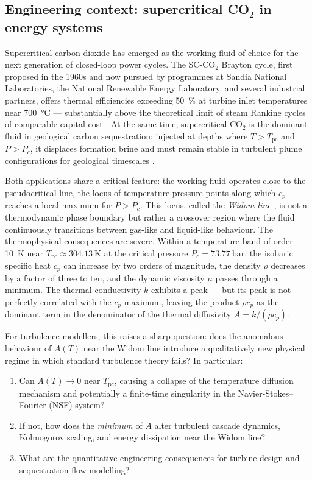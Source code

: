 \documentclass[12pt,a4paper]{article}
\newcommand{\Tc}{T_{\mathrm{pc}}}   %
\newcommand{\Pc}{P_c}               %
\newcommand{\sco}{SC-CO$_2$}
\begin{document}
\subsection{Engineering context: supercritical CO$_2$ in energy systems}
\label{sec:intro:context}

Supercritical carbon dioxide has emerged as the working fluid of choice for the next
generation of closed-loop power cycles.  The \sco{} Brayton cycle, first proposed
in the 1960s and now pursued by programmes at Sandia National Laboratories, the
National Renewable Energy Laboratory, and several industrial partners, offers thermal
efficiencies exceeding \SI{50}{\percent} at turbine inlet temperatures near
\SI{700}{\celsius} --- substantially above the theoretical limit of steam Rankine
cycles of comparable capital cost \citep{Duan2017}.  At the same time, supercritical
CO$_2$ is the dominant fluid in geological carbon sequestration: injected at depths
where $T > \Tc$ and $P > \Pc$, it displaces formation brine and must remain stable
in turbulent plume configurations for geological timescales \citep{Huppert2014}.

Both applications share a critical feature: the working fluid operates close to the
pseudocritical line, the locus of temperature-pressure points along which $c_p$
reaches a local maximum for $P > \Pc$.  This locus, called the \emph{Widom line}
\citep{Xu2005}, is not a thermodynamic phase boundary but rather a crossover region
where the fluid continuously transitions between gas-like and liquid-like behaviour.
The thermophysical consequences are severe.  Within a temperature band of order
\SI{10}{\kelvin} near $\Tc \approx \SI{304.13}{\kelvin}$ at the critical pressure
$\Pc = \SI{73.77}{\bar}$, the isobaric specific heat $c_p$ can increase by two
orders of magnitude, the density $\rho$ decreases by a factor of three to ten, and
the dynamic viscosity $\mu$ passes through a minimum.  The thermal conductivity $k$
exhibits a peak --- but its peak is not perfectly correlated with the $c_p$ maximum,
leaving the product $\rho c_p$ as the dominant term in the denominator of the thermal
diffusivity $A = k/(\rho c_p)$.

For turbulence modellers, this raises a sharp question: does the anomalous behaviour
of $A(T)$ near the Widom line introduce a qualitatively new physical regime in which
standard turbulence theory fails?  In particular:
\begin{enumerate}[label=(\roman*)]
  \item Can $A(T) \to 0$ near $\Tc$, causing a collapse of the temperature diffusion
    mechanism and potentially a finite-time singularity in the Navier-Stokes--Fourier
    (NSF) system?
  \item If not, how does the \emph{minimum} of $A$ alter turbulent cascade dynamics,
    Kolmogorov scaling, and energy dissipation near the Widom line?
  \item What are the quantitative engineering consequences for turbine design and
    sequestration flow modelling?
\end{enumerate}
\end{document}
